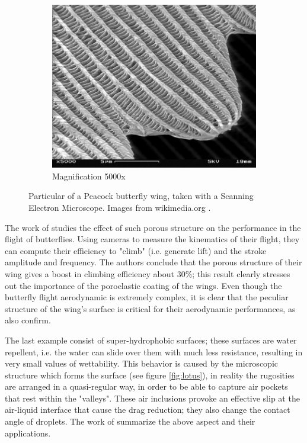 \begin{figure}[h]
\begin{subfigure}[b]{0.3\textwidth}
	\end{subfigure}
	\begin{subfigure}[b]{0.3\textwidth}
		\includegraphics[width=\textwidth]{chapter_1/butterfly3}
		\caption{Magnification 5000x}
		\label{fig:b5000}
	\end{subfigure}
	\caption{Particular of a Peacock butterfly wing, taken with a Scanning Electron Microscope.  Images from wikimedia.org .}
	\label{fig:butterfly}
\end{figure}

The work of \citet{slegers2017beneficial} studies the effect of such porous structure on the performance in the flight of butterflies.
Using cameras to measure the kinematics of their flight, they can compute their efficiency to "climb" (i.e. generate lift) and the stroke amplitude and frequency.
The authors conclude that the porous structure of their wing gives a boost in climbing efficiency about $30\%$; this result clearly stresses out the importance of the poroelastic coating of the wings. 
Even though the butterfly flight aerodynamic is extremely complex, it is clear that the peculiar structure of the wing's surface is critical for their aerodynamic performances, as also \citet{srygley2002unconventional} confirm.

The last example consist of super-hydrophobic surfaces; these surfaces are water repellent, i.e. the water can slide over them with much less resistance, resulting in very small values of wettability.
This behavior is caused by the microscopic structure which forms the surface (see figure \ref{fig:lotus}), in reality the rugosities are arranged in a quasi-regular way, in order to be able to capture air pockets that rest within the "valleys".
These air inclusions provoke an effective slip at the air-liquid interface that cause the drag reduction; they also change the contact angle of droplets.
The work of \citet{bottaro2003effect} summarize the above aspect and their applications.

